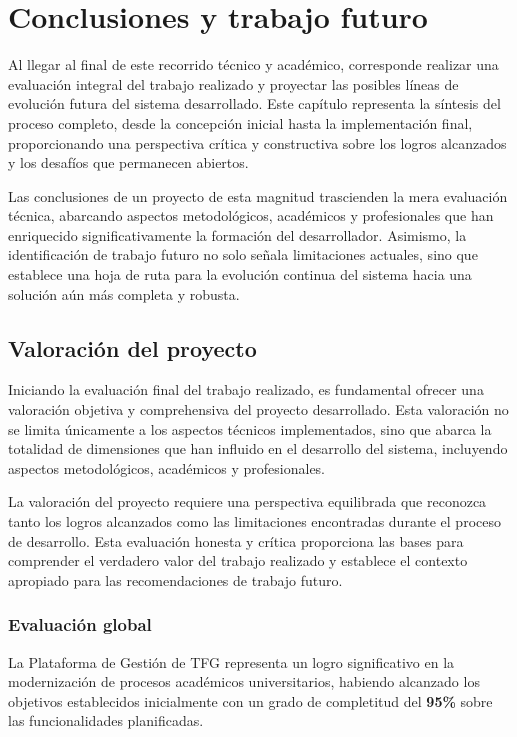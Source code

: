 \documentclass[12pt,a4paper,oneside]{report}
\begin{document}
\chapter{Conclusiones y trabajo
futuro}\label{conclusiones-y-trabajo-futuro}
Al llegar al final de este recorrido técnico y académico, corresponde
realizar una evaluación integral del trabajo realizado y proyectar las
posibles líneas de evolución futura del sistema desarrollado. Este
capítulo representa la síntesis del proceso completo, desde la
concepción inicial hasta la implementación final, proporcionando una
perspectiva crítica y constructiva sobre los logros alcanzados y los
desafíos que permanecen abiertos.

Las conclusiones de un proyecto de esta magnitud trascienden la mera
evaluación técnica, abarcando aspectos metodológicos, académicos y
profesionales que han enriquecido significativamente la formación del
desarrollador. Asimismo, la identificación de trabajo futuro no solo
señala limitaciones actuales, sino que establece una hoja de ruta para
la evolución continua del sistema hacia una solución aún más completa y
robusta.

\section{Valoración del proyecto}\label{valoraciuxf3n-del-proyecto}

Iniciando la evaluación final del trabajo realizado, es fundamental
ofrecer una valoración objetiva y comprehensiva del proyecto
desarrollado. Esta valoración no se limita únicamente a los aspectos
técnicos implementados, sino que abarca la totalidad de dimensiones que
han influido en el desarrollo del sistema, incluyendo aspectos
metodológicos, académicos y profesionales.

La valoración del proyecto requiere una perspectiva equilibrada que
reconozca tanto los logros alcanzados como las limitaciones encontradas
durante el proceso de desarrollo. Esta evaluación honesta y crítica
proporciona las bases para comprender el verdadero valor del trabajo
realizado y establece el contexto apropiado para las recomendaciones de
trabajo futuro.

\subsection{Evaluación global}\label{evaluaciuxf3n-global}

La Plataforma de Gestión de TFG representa un logro significativo en la
modernización de procesos académicos universitarios, habiendo alcanzado
los objetivos establecidos inicialmente con un grado de completitud del
\textbf{95\%} sobre las funcionalidades planificadas.
\end{document}
